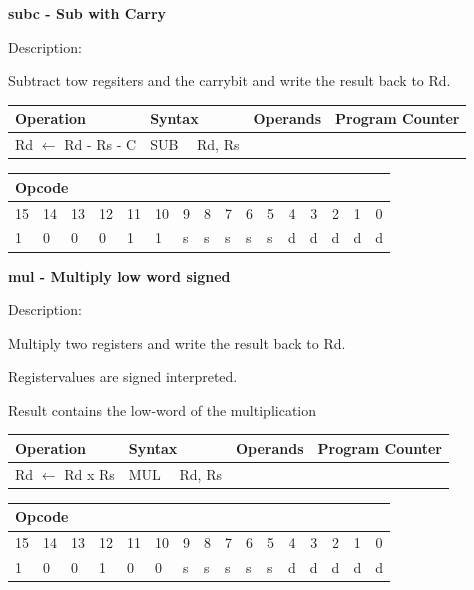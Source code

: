 \documentclass[%
	pdftex,
	a4paper,
	oneside,
	bibtotoc,%
	idxtotoc,%
	bibtotocnumbered,
	halfparskip,%
]{scrbook}
\begin{document}
\bigskip

\textbf{subc - Sub with Carry}

Description:

Subtract tow regsiters and the carrybit and write the result back to Rd.

\begin{tabular}{|l|l|l|l|}
\hline
Operation & Syntax & Operands & Program Counter \\ \hline
Rd $\leftarrow $ Rd - Rs - C & SUB \ \ Rd, Rs &  &  \\ \hline
\end{tabular}

\begin{tabular}{|c|c|c|c|c|c|c|c|c|c|c|c|c|c|c|c|}
\hline
\multicolumn{6}{|l|}{Opcode} & \multicolumn{5}{|l|}{} & \multicolumn{5}{|l|}{
} \\ \hline
15 & 14 & 13 & 12 & 11 & 10 & 9 & 8 & 7 & 6 & 5 & 4 & 3 & 2 & 1 & 0 \\ \hline
\multicolumn{1}{|l|}{1} & \multicolumn{1}{|l|}{0} & \multicolumn{1}{|l|}{0}
& \multicolumn{1}{|l|}{0} & \multicolumn{1}{|l|}{1} & \multicolumn{1}{|l|}{1}
& \multicolumn{1}{|l|}{s} & \multicolumn{1}{|l|}{s} & \multicolumn{1}{|l|}{s}
& \multicolumn{1}{|l|}{s} & \multicolumn{1}{|l|}{s} & \multicolumn{1}{|l|}{d}
& \multicolumn{1}{|l|}{d} & \multicolumn{1}{|l|}{d} & \multicolumn{1}{|l|}{d}
& \multicolumn{1}{|l|}{d} \\ \hline
\end{tabular}

\bigskip

\textbf{mul - Multiply low word signed}

Description:

Multiply two registers and write the result back to Rd.

Registervalues are signed interpreted.

Result contains the low-word of the multiplication

\begin{tabular}{|l|l|l|l|}
\hline
Operation & Syntax & Operands & Program Counter \\ \hline
Rd $\leftarrow $ Rd x Rs & MUL \ \ Rd, Rs &  &  \\ \hline
\end{tabular}

\begin{tabular}{|c|c|c|c|c|c|c|c|c|c|c|c|c|c|c|c|}
\hline
\multicolumn{6}{|l|}{Opcode} & \multicolumn{5}{|l|}{} & \multicolumn{5}{|l|}{
} \\ \hline
15 & 14 & 13 & 12 & 11 & 10 & 9 & 8 & 7 & 6 & 5 & 4 & 3 & 2 & 1 & 0 \\ \hline
\multicolumn{1}{|l|}{1} & \multicolumn{1}{|l|}{0} & \multicolumn{1}{|l|}{0}
& \multicolumn{1}{|l|}{1} & \multicolumn{1}{|l|}{0} & \multicolumn{1}{|l|}{0}
& \multicolumn{1}{|l|}{s} & \multicolumn{1}{|l|}{s} & \multicolumn{1}{|l|}{s}
& \multicolumn{1}{|l|}{s} & \multicolumn{1}{|l|}{s} & \multicolumn{1}{|l|}{d}
& \multicolumn{1}{|l|}{d} & \multicolumn{1}{|l|}{d} & \multicolumn{1}{|l|}{d}
& \multicolumn{1}{|l|}{d} \\ \hline
\end{tabular}
\end{document}
